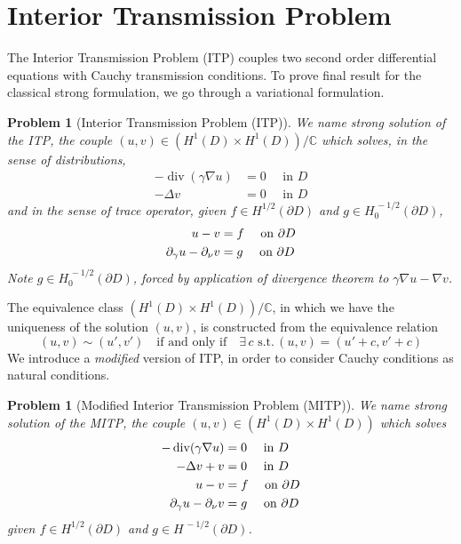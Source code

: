 \documentclass[10pt, a4paper, twoside, openright]{book}
\theoremstyle{definition}
\theoremstyle{plain}
\theoremstyle{plain}
\theoremstyle{plain}
\theoremstyle{plain}
\theoremstyle{plain}
\theoremstyle{plain}
\theoremstyle{plain}
\theoremstyle{plain}
\newtheorem{problem}[subsection]{Problem}
\DeclareMathOperator{\divergence}{div}
\begin{document}
\section{Interior Transmission Problem}
The Interior Transmission Problem (ITP) couples two second order differential equations with Cauchy transmission conditions.
To prove final result for the classical strong formulation, we go through a variational formulation.

\begin{mybox}
\begin{problem}[Interior Transmission Problem (ITP)]
\label{problem:ITP-dist}
We name \emph{strong solution} of the ITP, the couple {$(u,v) \in (H^1(D) \times H^1(D))/\mathbb{C}$} which solves, in the sense of distributions,
\begin{align}
-\divergence(\gamma\nabla u) & = 0\quad\text{ in }D \\
-\Delta v & = 0 \quad\text{ in }D
\end{align}
and in the sense of trace operator, given $f\in H^{1/2}(\partial D)$ and $g\in H^{\,-1/2}_0(\partial D)$,
\begin{align}
  u - v & = f \quad\textup{ on }\partial D\\
  \partial_\gamma u - \partial_\nu v & = g \quad\textup{ on }\partial D
\end{align}
Note $g\in H^{\,-1/2}_0(\partial D)$, forced by application of divergence theorem to $\gamma\nabla u - \nabla v$.
\end{problem}
\end{mybox}
The equivalence class $(H^1(D) \times H^1(D))/\mathbb{C}$, in which we have the uniqueness of the solution $(u,v)$, is constructed from the equivalence relation
\begin{equation}
 (u,v)\sim(u',v') \quad \text{if and only if} \quad \exists \,c \,\,\text{s.t.}\,(u,v) = (u' + c,v' + c) 
\end{equation}
We introduce a \emph{modified} version of ITP, in order to consider Cauchy conditions as natural conditions.
\begin{mybox}
\begin{problem}[Modified Interior Transmission Problem (MITP)]
\label{problem:MITP-dist}
We name \emph{strong solution} of the MITP, the couple {$(u,v) \in (H^1(D) \times H^1(D))$} which solves
\begin{align}
-\divergence(\gamma\nabla u) & = 0\quad\text{ in }D \\
-\Delta v + v & = 0 \quad\text{ in }D \\
  u - v & = f \quad\textup{ on }\partial D\\
  \partial_\gamma u - \partial_\nu v & = g \quad\textup{ on }\partial D
\end{align}
given $f\in H^{1/2}(\partial D)$ and $g\in H^{\,-1/2}(\partial D)$.
\end{problem}
\end{mybox}
\end{document}
